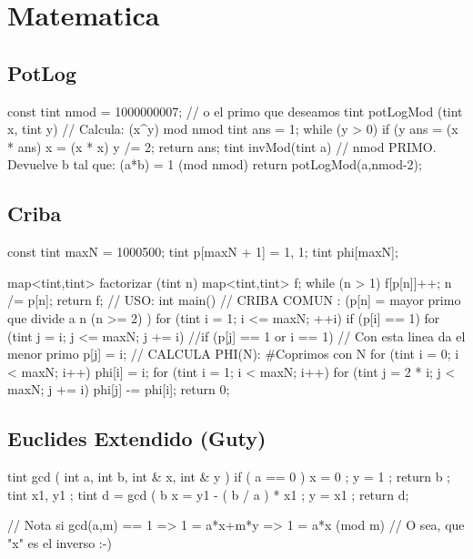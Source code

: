 \section{Matematica}

\subsection{PotLog}
\begin{code}
const tint nmod = 1000000007; // o el primo que deseamos
tint potLogMod (tint x, tint y) // Calcula: (x^y) mod nmod
{
	tint ans = 1;
	while (y > 0)
	{
		if (y %
			ans = (x * ans) %
		x = (x * x) %
		y /= 2;
	}
	return ans;
}
tint invMod(tint a) // nmod PRIMO. Devuelve b tal que: (a*b) = 1 (mod nmod) 
{
	return potLogMod(a,nmod-2);
}
\end{code}

\subsection{Criba}
\begin{code}
const tint maxN = 1000500;
tint p[maxN + 1] = {1, 1};
tint phi[maxN]; 

map<tint,tint> factorizar (tint n)
{
	map<tint,tint> f;
	while (n > 1) 
	{ 
		f[p[n]]++;
		n /= p[n]; 
	}
	return f;
}
// USO:
int main()
{
	// CRIBA COMUN : (p[n] = mayor primo que divide a n (n >= 2) )
	for (tint i = 1; i <= maxN; ++i)
		if (p[i] == 1)
			for (tint j = i; j <= maxN; j += i)
				//if (p[j] == 1 or i == 1) // Con esta linea da el menor primo
				p[j] = i;
	// CALCULA PHI(N): #Coprimos con N
	for (tint i = 0; i < maxN; i++) 
		phi[i] = i;	
	for (tint i = 1; i < maxN; i++)
	for (tint j = 2 * i; j < maxN; j += i)
		phi[j] -= phi[i];
	return 0;
}
\end{code}

\subsection{Euclides Extendido (Guty)}
\begin{code}
tint gcd ( int a, int b, int & x, int & y )
{
	if ( a == 0 ) 
	{
		x = 0 ; y = 1 ;
		return b ;
	}
	tint x1, y1 ;
	tint d = gcd ( b %
	x = y1 - ( b / a ) * x1 ;
	y = x1 ;
	return d;
} 

// Nota si gcd(a,m) == 1 => 1 = a*x+m*y => 1 = a*x (mod m)
// O sea, que "x" es el inverso :-)

\end{code}


